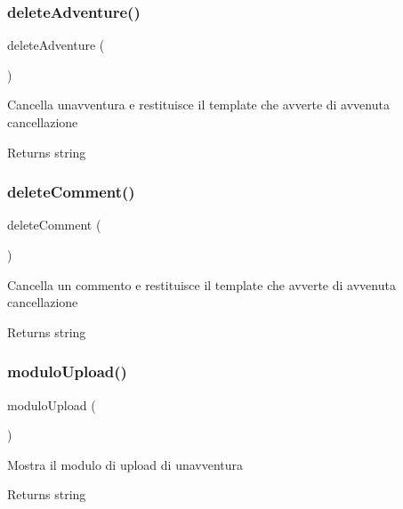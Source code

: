\subsubsection{\texorpdfstring{delete\+Adventure()}{deleteAdventure()}}
{\footnotesize\ttfamily delete\+Adventure (\begin{DoxyParamCaption}{ }\end{DoxyParamCaption})}

Cancella un\textquotesingle{}avventura e restituisce il template che avverte di avvenuta cancellazione

\begin{DoxyReturn}{Returns}
string 
\end{DoxyReturn}
\mbox{\label{class_c_upload_adbd11f5b7c6e8d9e5d1c6f35540f4e4c}} 
\subsubsection{\texorpdfstring{delete\+Comment()}{deleteComment()}}
{\footnotesize\ttfamily delete\+Comment (\begin{DoxyParamCaption}{ }\end{DoxyParamCaption})}

Cancella un commento e restituisce il template che avverte di avvenuta cancellazione

\begin{DoxyReturn}{Returns}
string 
\end{DoxyReturn}
\mbox{\label{class_c_upload_af458f67cbfe0c2bc648f0bf32bd3c970}} 
\subsubsection{\texorpdfstring{modulo\+Upload()}{moduloUpload()}}
{\footnotesize\ttfamily modulo\+Upload (\begin{DoxyParamCaption}{ }\end{DoxyParamCaption})}

Mostra il modulo di upload di un\textquotesingle{}avventura

\begin{DoxyReturn}{Returns}
string 
\end{DoxyReturn}
\mbox{\label{class_c_upload_a9c4c3362aa5a2db624792c7cf90711e2}} 

